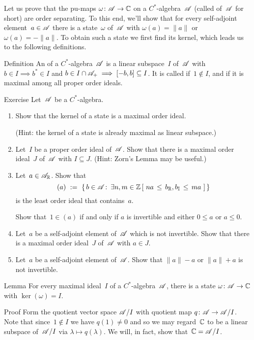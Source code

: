 \documentclass[a]{subfiles}
\begin{document}
\begin{parsec}%
\begin{point}%
Let us prove
that the pu-maps $\omega\colon \mathscr{A}\to\mathbb{C}$
on a $C^*$-algebra~$\mathscr{A}$
(called  of~$\mathscr{A}$ for short)
are order separating.
To this end, we'll show that 
for every self-adjoint element~$a\in \mathscr{A}$
there is a state~$\omega$ of~$\mathscr{A}$ with $\omega(a)=\|a\|$ or 
$\omega(a)=-\|a\|$.
To obtain such a state
we first find its kernel,
which leads us to the following definitions.
\end{point}
\begin{point}{Definition}%
An 
of a $C^*$-algebra~$\mathscr{A}$
is a linear subspace~$I$ of~$\mathscr{A}$
with $b\in I\implies b^*\in I$
and $b\in I\cap\mathscr{A}_{+}\implies [-b,b]\subseteq I$.
It is called  if~$1\notin I$,
and  if it is maximal among all proper order ideals.
\end{point}
\begin{point}{Exercise}%
Let~$\mathscr{A}$ be a $C^*$-algebra.
\begin{enumerate}
\item
Show that the kernel of a state is a maximal order ideal.

(Hint: the kernel of a state is already maximal as linear subspace.)
\item
Let~$I$ be a proper order ideal of~$\mathscr{A}$.
Show that there is a maximal 
order ideal~$J$ of~$\mathscr{A}$ with $I\subseteq J$.
(Hint: Zorn's Lemma may be useful.)
\item
Let~$a\in \mathscr{A}_{\mathbb{R}}$.
Show that 
\begin{equation*}
(a)\ := \ \{\, b\in \mathscr{A}\colon\, \exists n,m\in \mathbb{Z}\,
[\ na \,\leq\, b_{\mathbb{R}},b_{\mathbb{I}}\,\leq\, ma\ ]\,\}
\end{equation*}
is the least order ideal that contains~$a$.

Show that~$1\in (a)$ if and only if $a$ is invertible
and either $0\leq a$ or $a\leq 0$.

\item
Let~$a$ be a self-adjoint element of~$\mathscr{A}$ which
is not invertible.
Show that there is a maximal order ideal~$J$
of~$\mathscr{A}$
with $a\in J$.

\item
Let~$a$ be a self-adjoint element of~$\mathscr{A}$.
Show that  $\|a\|-a$
or $\|a\|+a$ is not invertible.
\end{enumerate}
\end{point}
\begin{point}{Lemma}%
For every maximal ideal~$I$ of a $C^*$-algebra~$\mathscr{A}$,
 there is a state $\omega \colon \mathscr{A}\to \mathbb{C}$
with $\ker(\omega)=I$.
\begin{point}{Proof}%
Form the quotient vector space $\mathscr{A}/I$
with quotient map $q\colon \mathscr{A}\to \mathscr{A}/I$.
Note that since~$1\notin I$
we have $q(1)\neq 0$
and so we may regard~$\mathbb{C}$ 
to be a linear subspace of~$\mathscr{A}/I$
via $\lambda\mapsto q(\lambda)$.
We will, in fact, show that~$\mathbb{C}=\mathscr{A}/I$.


\end{point}
\end{point}
\end{parsec}
\end{document}
